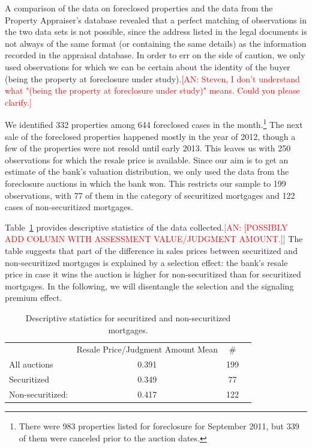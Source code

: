 \documentclass[11pt,twopage]{article}
\newcommand{\AN}[1]{\textcolor{red}{[AN: #1]}}
\begin{document}
A comparison of the data on foreclosed properties and the data from
the Property Appraiser's database revealed that a perfect matching of
observations in the two data sets is not possible, since the address
listed in the legal documents is not always of the same format (or
containing the same details) as the information recorded in the
appraisal database. In order to err on the side of caution, we only
used observations for which we can be certain about the identity of
the buyer (being the property at foreclosure under study).\AN{Steven,
  I don't understand what "(being the property at foreclosure under
  study)" means. Could you please clarify.}

We identified 332 properties among 644 foreclosed cases in the
month.\footnote{There were 983 properties listed for foreclosure for
  September 2011, but 339 of them were canceled prior to the auction
  dates.} The next sale of the foreclosed properties happened mostly
in the year of 2012, though a few of the properties were not resold
until early 2013. This leaves us with 250 observations for which the
resale price is available. Since our aim is to get an estimate of the
bank's valuation distribution, we only used the data from the
foreclosure auctions in which the bank won. This restricts our sample
to 199 observations, with 77 of them in the category of securitized
mortgages and 122 cases of non-securitized mortgages.

Table~\ref{tab:descriptive-securitization-resale} provides descriptive
statistics of the data collected.\AN{[POSSIBLY ADD COLUMN WITH
  ASSESSMENT VALUE/JUDGMENT AMOUNT.]} The table suggests that part of
the difference in sales prices between securitized and non-securitized
mortgages is explained by a selection effect: the bank's resale price
in case it wins the auction is higher for non-securitized than for
securitized mortgages. In the following, we will disentangle the
selection and the signaling premium effect.

\begin{table}[!htbp]
  \centering \caption{Descriptive statistics for securitized and
    non-securitized mortgages. %
    \label{tab:descriptive-securitization-resale}}
  \begin{tabular}{lccc}
    \hline\hline
    & Resale Price/Judgment Amount Mean %
    & \#\\
    All auctions & 0.391 %
    & 199 \\
    Securitized & 0.349 %
    & 77 \\
    Non-securitized: & 0.417 %
    & 122 \\
    \hline
  \end{tabular}
\end{table}
\end{document}
